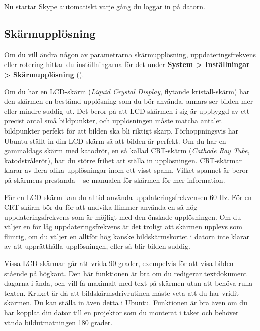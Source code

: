 \documentclass[a4paper,final]{memoir} %
\begin{document}
Nu startar Skype automatiskt varje gång du loggar in på datorn.


\subsection{Skärmupplösning}\label{upplosning}


Om du vill ändra någon av parametrarna skärmupplösning, uppdateringsfrekvens eller rotering hittar du inställningarna för det under \textbf{System \textgreater{} Inställningar \textgreater{} Skärmupplösning} ().

Om du har en LCD-skärm (\textit{Liquid Crystal Display}, flytande kri\-stall-skärm) har den skärmen en bestämd upplösning som du bör använda, annars ser bilden mer eller mindre suddig ut. Det beror på att LCD-skärmen i sig är uppbyggd av ett precist antal små bildpunkter, och upplösningen måste matcha antalet bildpunkter perfekt för att bilden ska bli riktigt skarp. Förhoppningsvis har Ubuntu ställt in din LCD-skärm så att bilden är perfekt. Om du har en gammaldags skärm med katodrör, en så kallad CRT-skärm (\textit{Cathode Ray Tube}, katodstrålerör), har du större frihet att ställa in upplösningen. CRT-skärmar klarar av flera olika upplösningar inom ett visst spann. Vilket spannet är beror på skärmens prestanda -- se manualen för skärmen för mer information.

För en LCD-skärm kan du alltid använda uppdateringsfrekvensen 60 Hz. För en CRT-skärm bör du för att undvika flimmer använda en så hög uppdateringsfrekvens som är möjligt med den önskade upplösningen. Om du väljer en för låg uppdateringsfrekvens är det troligt att skärmen upplevs som flimrig, om du väljer en alltför hög kanske bildskärmskortet i datorn inte klarar av att upprätthålla upplösningen, eller så blir bilden suddig.

Vissa LCD-skärmar går att vrida 90 grader, exempelvis för att visa bilden stående på högkant. Den här funktionen är bra om du redigerar textdokument dagarna i ända, och vill få maximalt med text på skärmen utan att behöva rulla texten. Kruxet är då att bildskärmsdrivrutinen måste veta att du har vridit skärmen. Du kan ställa in även detta i Ubuntu. Funktionen är bra även om du har kopplat din dator till en projektor som du monterat i taket och behöver vända bildutmatningen 180 grader.
\end{document}
